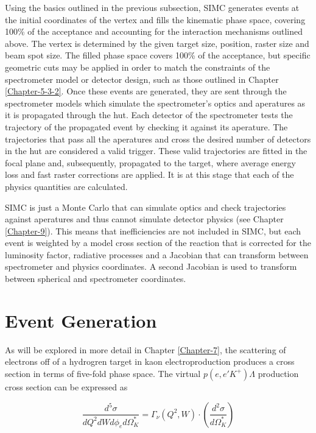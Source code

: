 \documentclass[
]{report}
\begin{document}
Using the basics outlined in the previous subsection, SIMC generates
events at the initial coordinates of the vertex and fills the kinematic
phase space, covering 100\% of the acceptance and accounting for the
interaction mechanisms outlined above. The vertex is determined by the
given target size, position, raster size and beam spot size. The filled
phase space covers 100\% of the acceptance, but specific geometric cuts
may be applied in order to match the constraints of the spectrometer
model or detector design, such as those outlined in Chapter
\ref{Chapter-5-3-2}. Once these events are generated, they are sent
through the spectrometer models which simulate the spectrometer's optics
and aperatures as it is propagated through the hut. Each detector of the
spectrometer tests the trajectory of the propagated event by checking it
against its aperature. The trajectories that pass all the aperatures and
cross the desired number of detectors in the hut are considered a valid
trigger. These valid trajectories are fitted in the focal plane and,
subsequently, propagated to the target, where average energy loss and
fast raster corrections are applied. It is at this stage that each of
the physics quantities are calculated.

SIMC is just a Monte Carlo that can simulate optics and check
trajectories against aperatures and thus cannot simulate detector
physics (see Chapter \ref{Chapter-9}). This means that inefficiencies
are not included in SIMC, but each event is weighted by a model cross
section of the reaction that is corrected for the luminosity factor,
radiative processes and a Jacobian that can transform between
spectrometer and physics coordinates. A second Jacobian is used to
transform between spherical and spectrometer coordinates.

\hypertarget{Section-6.2}{%
\section{Event Generation}\label{Section-6.2}}

As will be explored in more detail in Chapter \ref{Chapter-7}, the
scattering of electrons off of a hydrogren target in kaon
electroproduction produces a cross section in terms of five-fold phase
space. The virtual \(p(e,e'K^+)\Lambda\) production cross section can be
expressed as

\begin{equation} 
  \frac{d^5\sigma}{dQ^2dWd\phi_ed\Omega^*_K}=\Gamma_{\nu}(Q^2,W)\cdot(\frac{d^2\sigma}{d\Omega^*_K})
  \label{eq:sig_orderfive_virtual_physics} 
\end{equation}
\end{document}
